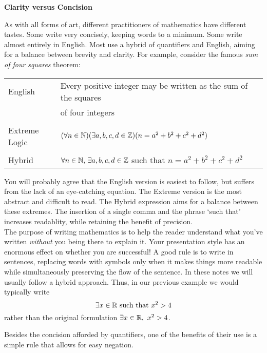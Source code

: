 \begin{aside}{}{}
{\bf Clarity versus Concision}

As with all forms of art, different practitioners of mathematics have different tastes. Some write very concisely, keeping words to a minimum. Some write almost entirely in English. Most use a hybrid of quantifiers and English, aiming for a balance between brevity and clarity. For example, consider the famous \emph{sum of four squares} theorem:
\begin{center}
\begin{tabular}{l|l}
English & Every positive integer may be written as the sum of the squares\\
&of four integers\\[4pt]\hline
\\[-8pt]
Extreme Logic & $(\forall n\in\mathbb{N})(\exists a,b,c,d\in\mathbb{Z})(n=a^2+b^2+c^2+d^2)$\\[4pt]\hline
\\[-8pt]
Hybrid & $\forall n\in\mathbb{N},\, \exists a,b,c,d\in\mathbb{Z}$ such that $n=a^2+b^2+c^2+d^2$
\end{tabular}
\end{center}
You will probably agree that the English version is easiest to follow, but suffers from the lack of an eye-catching equation. The Extreme  version is the most abstract and difficult to read. The Hybrid expression aims for a balance between these extremes. The insertion of a single comma and the phrase `such that' increases readablity, while retaining the benefit of precision.\\

 The purpose of writing mathematics is to help the reader understand what you've written \emph{without} you being there to explain it. Your presentation style has an enormous effect on whether you are successful! A good rule is to write in sentences, replacing words with symbols only when it makes things more readable while simultaneously preserving the flow of the sentence. In these notes we will usually follow a hybrid approach. Thus, in our previous example we would typically write
\[\exists x\in\mathbb{R}\text{ such that } x^2>4\]
rather than the original formulation $\exists x\in\mathbb{R},\ x^2>4$.
\end{aside}\goodbreak



Besides the concision afforded by quantifiers, one of the benefits of their use is a simple rule that allows for easy negation.

